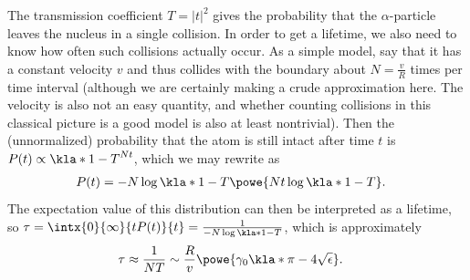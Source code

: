 \documentclass[english, parskip=full]{scrartcl}
\begin{document}
The transmission coefficient $T=|t|^2$ gives the probability that the $\alpha$-particle leaves the nucleus in a single collision.
In order to get a lifetime, we also need to know how often such collisions actually occur.
As a simple model, say that it has a constant velocity $v$ and thus collides with the boundary about $N=\frac{v}{R}$ times per time interval (although we are certainly making a crude approximation here. The velocity is also not an easy quantity, and whether counting collisions in this classical picture is a good model is also at least nontrivial).
Then the (unnormalized) probability that the atom is still intact after time $t$ is $P(t)\propto \kla*{1-T}^{Nt}$, which we may rewrite as%
\begin{align}
P(t) &= -N\log\kla*{1-T} \powe{Nt \log\kla*{1-T}}.
\end{align}
The expectation value of this distribution can then be interpreted as a lifetime, so $\tau = \intx{0}{\infty}{t P(t)}{t} = \frac{1}{-N \log\kla*{1-T}}$, which is approximately
\begin{align}
\tau &\approx \frac{1}{NT} \sim \frac{R}{v} \powe{\gamma_0 \kla*{\pi - 4\sqrt{\epsilon}}}.
\end{align}
\end{document}
